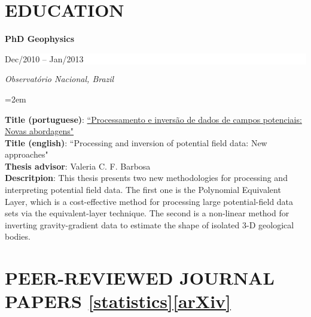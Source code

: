 \documentclass[paper=letter,fontsize=11pt]{scrartcl} %
\newcommand{\sepspace}{\vspace*{1em}}		%
\newcommand{\NewPart}[2]{\section*{\uppercase{#1} #2}}
\newcommand{\EducationEntry}[4]{
		\noindent \textbf{#1} \hfill      %
		\colorbox{White}{%
			\parbox{10em}{%
			\hfill\color{Black}#2}} \par  %
		\noindent \textit{#3} \par        %
		\noindent\hangindent=2em\hangafter=0 \small #4 %
		\normalsize \par}
\begin{document}
\sepspace

\NewPart{Education}{}

\EducationEntry{\Large PhD Geophysics}{\begin{flushright} Dec/2010 -- Jan/2013 \end{flushright} \vspace{-0.2in}}{Observat\'{o}rio Nacional, Brazil}

\sepspace \noindent
\textbf{Title (portuguese)}: \href{http://www.pinga-lab.org/thesis/oliveira-jr-phd.html}{``Processamento e invers\~{a}o de dados de campos potenciais: Novas abordagens"} \\
\textbf{Title (english)}: ``Processing and inversion of potential field data: New approaches" \\
\textbf{Thesis advisor}: Valeria C. F. Barbosa \\
\textbf{Descritpion}: This thesis presents two new methodologies for processing and interpreting potential field data. The first one is the Polynomial Equivalent Layer, which is a cost-effective method for processing large potential-field data sets via the equivalent-layer technique. The second is a non-linear method for inverting gravity-gradient data to estimate the shape of isolated 3-D geological bodies.

\sepspace

\newpage





\NewPart{Peer-Reviewed Journal Papers}{\href{http://scholar.google.com/citations?hl=en&user=1z6xR14AAAAJ}{[statistics]}\href{http://arxiv.org/find/cond-mat/1/au:+Appelbaum_I/0/1/0/all/0/1}{[arXiv]}}
\end{document}
